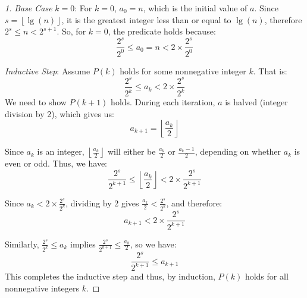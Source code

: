 \documentclass[
	12pt, %
	fleqn, %
	a4paper, %
]{LegrandOrangeBook}
\begin{document}
\begin{proof}[1]
    \textit{Base Case} \(k=0\):
For \(k = 0\), \(a_0 = n\), which is the initial value of \(a\). Since \(s = \left\lfloor \lg(n) \right\rfloor\), it is the greatest integer less than or equal to \(\lg(n)\), therefore \(2^s \leq n < 2^{s+1}\). So, for \(k = 0\), the predicate holds because:
\[
\frac{2^s}{2^0} \leq a_0 = n < 2 \times \frac{2^s}{2^0}
\]

\textit{Inductive Step}:
Assume \(P(k)\) holds for some nonnegative integer \(k\). That is:
\[
\frac{2^s}{2^k} \leq a_k < 2 \times \frac{2^s}{2^k}
\]
We need to show \(P(k+1)\) holds. During each iteration, \(a\) is halved (integer division by 2), which gives us:
\[
a_{k+1} = \left\lfloor \frac{a_k}{2} \right\rfloor
\]

Since \(a_k\) is an integer, \(\left\lfloor \frac{a_k}{2} \right\rfloor\) will either be \(\frac{a_k}{2}\) or \(\frac{a_k - 1}{2}\), depending on whether \(a_k\) is even or odd. Thus, we have:
\[
\frac{2^s}{2^{k+1}} \leq \left\lfloor \frac{a_k}{2} \right\rfloor < 2 \times \frac{2^s}{2^{k+1}}
\]

Since \(a_k < 2 \times \frac{2^s}{2^k}\), dividing by 2 gives \(\frac{a_k}{2} < \frac{2^s}{2^k}\), and therefore:
\[
a_{k+1} < 2 \times \frac{2^s}{2^{k+1}}
\]

Similarly, \(\frac{2^s}{2^k} \leq a_k\) implies \(\frac{2^s}{2^{k+1}} \leq \frac{a_k}{2}\), so we have:
\[
\frac{2^s}{2^{k+1}} \leq a_{k+1}
\]
This completes the inductive step and thus, by induction, \(P(k)\) holds for all nonnegative integers \(k\).
\end{proof}
\end{document}
